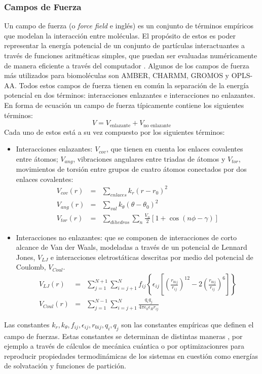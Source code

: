 \documentclass[12pt]{article}
\begin{document}
\subsubsection{Campos de Fuerza}
Un campo de fuerza (o \textit{force field} e inglés) es un conjunto de términos empíricos que modelan la interacción entre moléculas. El propósito de estos es poder representar la energía potencial de un conjunto de partículas interactuantes a través de funciones aritméticas simples, que puedan ser evaluadas numéricamente de manera eficiente a través del computador \cite{Kukol2014MolecularEdition}. Algunos de los campos de fuerza más utilizados para biomoléculas son AMBER, CHARMM, GROMOS y OPLS-AA. Todos estos campos de fuerza tienen en común la separación de la energía potencial en dos términos: interacciones enlazantes e interacciones no enlazantes. En forma de ecuación un campo de fuerza típicamente contiene los siguientes términos:
\begin{equation}\label{eq:5}
    V=V_{\text{enlazante}}+V_{\text{no enlazante}}
\end{equation}
Cada uno de estos está a su vez compuesto por los siguientes términos:
\begin{itemize}
\item Interacciones enlazantes: $V_{cov}$, que tienen en cuenta los enlaces covalentes entre átomos; $V_{ang}$, vibraciones angulares entre triadas de átomos y $V_{tor}$, movimientos de torsión entre grupos de cuatro átomos conectados por dos enlaces covalentes:
\begin{eqnarray}\label{eq:6}
V_{cov}(r)&=&\sum_{enlaces}k_r\left(r-r_0\right)^2\\
V_{ang}(r)&=&\sum_{val}k_\theta\left(\theta-\theta_{0}\right)^2\\
V_{tor}(r)&=&\sum_{dihedros}\sum_{n}\frac{V_n}{2}\left[1+\cos(n\phi-\gamma)\right]
\end{eqnarray}
\item Interacciones no enlazantes: que se componen de interacciones de corto alcance de Van der Waals, modeladas a través de un potencial de Lennard Jones, $V_{LJ}$ e interacciones eletrostáticas descritas por medio del potencial de Coulomb, $V_{Coul}$.
\begin{eqnarray}\label{eq:7}
V_{LJ}(r)&=&\sum_{j=1}^{N+1}\sum_{i=j+1}^N f_{ij}\left\{\epsilon_{ij}\left[\left(\frac{r_{0ij}}{r_{ij}}\right)^{12}-2\left(\frac{r_{0ij}}{r_{ij}}\right)^6\right]\right\}\\
V_{Coul}(r)&=&\sum_{j=1}^{N-1}\sum_{i=j+1}^{N}\frac{q_iq_j}{4\pi\epsilon_0\epsilon_R r_{ij}}
\end{eqnarray}
\end{itemize}
Las constantes $k_r,k_\theta,f_{ij},\epsilon_{ij},r_{0ij},q_{i},q_{j}$ son las constantes emp\'{i}ricas que definen el campo de fuerzas. Estas constantes se determinan de distintas maneras , por ejemplo a través de cálculos de mecánica cuántica o por optimizacionres para reproducir propiedades termodinámicas de los sistemas en cuestión como energías de solvatación y funciones de partición.
\end{document}
